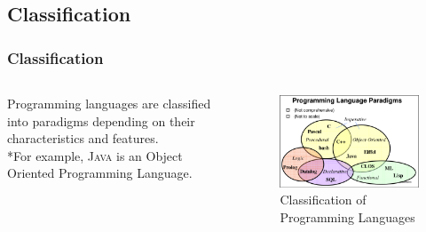 \documentclass[hideothersubsections]{beamer}
\begin{document}
\subsection{Classification}
\begin{frame}
\frametitle{Classification}
  \begin{columns}[T]
    \begin{column}{.5\textwidth}
     \begin{block}{}
Programming languages are classified into paradigms depending on their characteristics and features. 
\\*For example, \textsc{Java} is an Object Oriented Programming Language.
    \end{block}
    \end{column}
    \begin{column}{.5\textwidth}
    \begin{block}{}
\begin{figure}
    \includegraphics[width=\textwidth]{classification.png} 
    \caption{Classification of Programming Languages}
 \end{figure}   
    \end{block}
    \end{column}
  \end{columns}
  \note[item]{}
\end{frame}
\end{document}
